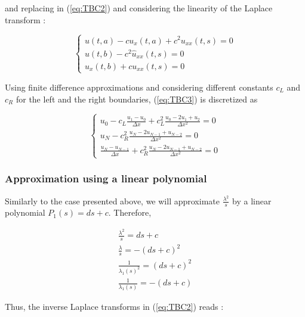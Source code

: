 \noindent and replacing in (\ref{eq:TBC2}) and considering the linearity of the Laplace transform : 

\begin{equation}
\label{eq:TBC3}
    \begin{cases}
        u(t,a) - c u_x(t,a)  + c^2  u_{xx}(t,s) = 0 \\
        u(t,b) - c^2    \hat{u}_{xx}(t,s) = 0 \\
        u_x(t,b) + c u_{xx}(t,s)= 0 
    \end{cases}
\end{equation}

\indent Using finite difference approximations and considering different constants $c_L$ and $c_R$ for the left and the right boundaries, (\ref{eq:TBC3}) is discretized as

\begin{equation}
\label{eq:TBC4}
    \begin{cases}
        u_0 - c_L \frac{u_1 - u_0}{\Delta x}  + c_L^2  \frac{u_0 -2u_1 + u_2}{\Delta x^2} = 0 \\
        u_N - c_R^2    \frac{u_N -2u_{N-1} + u_{N-2}}{\Delta x^2} = 0 \\
        \frac{u_N - u_{N-1}}{\Delta x}  + c_R^2    \frac{u_N -2u_{N-1} + u_{N-2}}{\Delta x^2} = 0 
    \end{cases}
\end{equation}



\subsubsection{Approximation using a linear polynomial}


\indent Similarly to the case presented above, we will approximate $\frac{\lambda^2}{s}$ by a linear polynomial $P_1(s) = ds + c$. Therefore,

\begin{equation}
	\begin{gathered}
    \frac{\lambda^2}{s} = ds + c \\
    \frac{\lambda}{s} = -(ds + c )^2 \\
    \frac{1}{\lambda_1(s)^2} = (ds + c )^2 \\
    \frac{1}{\lambda_1(s)} = -(ds + c )  
    \end{gathered}
\end{equation}

\indent Thus, the inverse Laplace transforms in (\ref{eq:TBC2}) reads :

